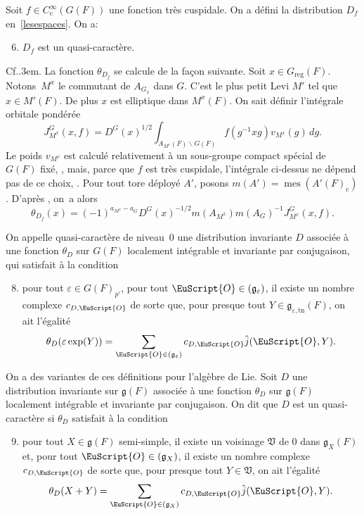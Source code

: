 \documentclass[JEP,XML,SOM,Unicode,francais]{cedram}
\let\mathcal \EuScript
\newcommand{\NoChangel}[1]{%
\expandafter\let\csname old\string#1\endcsname=#1
\let#1=\relax
\newcommand{#1}{\mathcode`l="716C\csname old\string#1\endcsname\mathcode`l="7160 }%
}
\let\epsilon\varepsilon
\newcommand\Cf{Cf.\kern.3em}
\newcommand{\frg}{\mathfrak{g}}
\newcommand{\frV}{\mathfrak{V}}
\newcommand{\rc}{\mathrm{c}}
\newcommand{\Nil}{\mathrm{Nil}} \NoChangel{\Nil}
\newcommand{\reg}{\mathrm{reg}}
\newcommand{\tn}{\mathrm{tn}}
\DeclareMathOperator{\mes}{mes}
\newcommand{\cO}{\mathcal{O}}
\theoremstyle{plain}
\theoremstyle{definition}
\begin{document}
Soit $f\in C_{\rc}^{\infty}(G(F))$ une fonction très cuspidale. On a défini la distribution $D_{f}$ en~\ref{lesespaces}. On a:
\begin{enumerate}\setcounter{enumi}{5}
\item\label{quasicaracteres6}
$D_{f}$ est un quasi-caractère.
\end{enumerate}
\Cf \cite[5.9]{W1}. La fonction $\theta_{D_{f}}$ se calcule de la façon suivante. Soit $x\in G_{\reg}(F)$. Notons~$M^x$ le commutant de $A_{G_{x}}$ dans $G$. C'est le plus petit Levi $M'$ tel que $x\in M'(F)$. De plus $x$ est elliptique dans $M^{x}(F)$. On sait définir l'intégrale orbitale pondérée
\[
J^G_{M^{x}}(x,f)=D^G(x)^{1/2}\int_{A_{M^{x}}(F)\backslash G(F)}f(g^{-1}xg)v_{M^{x}}(g)\,dg.
\]
Le poids $v_{M^{x}}$ est calculé relativement à un sous-groupe compact spécial de $G(F)$ fixé, \cf \cite{A1}, mais, parce que $f$ est très cuspidale, l'intégrale ci-dessus ne dépend pas de ce choix, \cf \cite[Lem.\,5.2]{W1}. Pour tout tore déployé $A'$, posons $m(A')=\mes(A'(F)_{\rc})$. D'après \cite[9(1)]{W2}, on~a alors
\begin{equation}\tag{7}\label{quasicaracteres7}
\theta_{D_{f}}(x)=(-1)^{a_{M^{x}}-a_{G}}D^G(x)^{-1/2}m(A_{M^{x}})m(A_{G})^{-1}J^G_{M^{x}}(x,f).
\end{equation}

On appelle quasi-caractère de niveau~$0$ une distribution invariante $D$ associée à une fonction $\theta_{D}$ sur $G(F)$ localement intégrable et invariante par conjugaison, qui satisfait à la condition
\begin{enumerate}\setcounter{enumi}{7}
\item\label{quasicaracteres8}
pour tout $\epsilon\in G(F)_{p'}$, pour tout $\cO\in \Nil(\frg_{\epsilon})$, il existe un nombre complexe $c_{D,\cO}$ de sorte que, pour presque tout $Y\in \frg_{\epsilon,\tn}(F)$, on ait l'égalité
\[
\theta_{D}(\epsilon \exp(Y))=\sum_{\cO\in \Nil(\frg_{\epsilon})}c_{D,\cO}\hat{j}(\cO,Y).
\]
\end{enumerate}

On a des variantes de ces définitions pour l'algèbre de Lie. Soit $D$ une distribution invariante sur $\frg(F)$ associée à une fonction $\theta_{D}$ sur $\frg(F)$ localement intégrable et invariante par conjugaison. On dit que $D$ est un quasi-caractère si $\theta_{D}$ satisfait à la condition
\begin{enumerate}\setcounter{enumi}{8}
\item\label{quasicaracteres9}
pour tout $X\in \frg(F)$ semi-simple, il existe un voisinage $\frV$ de $0$ dans $\frg_{X}(F)$ et, pour tout $\cO\in \Nil(\frg_{X})$, il existe un nombre complexe $c_{D,\cO}$ de sorte que, pour presque tout $Y\in \frV$, on ait l'égalité
\[
\theta_{D}(X+Y)=\sum_{\cO\in \Nil(\frg_{X})}c_{D,\cO}\hat{j}(\cO,Y).
\]
\end{enumerate}
\end{document}
